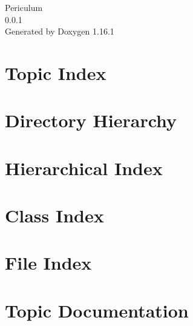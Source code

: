 \documentclass[twoside]{book}
\newcommand{\+}{\discretionary{\mbox{\scriptsize$\hookleftarrow$}}{}{}}
\newcommand{\clearemptydoublepage}{%
    \newpage{\pagestyle{empty}\cleardoublepage}%
  }
\begin{document}
  \raggedbottom
    \hypersetup{pageanchor=false,
                bookmarksnumbered=true,
                pdfencoding=unicode
               }
  \begin{titlepage}
  \vspace*{7cm}
  \begin{center}%
  {\Large Periculum}\\
  [1ex]\large 0.\+0.\+1 \\
  \vspace*{1cm}
  {\large Generated by Doxygen 1.16.1}\\
  \end{center}
  \end{titlepage}
  \clearemptydoublepage
  \tableofcontents
  \clearemptydoublepage
  \hypersetup{pageanchor=true}
\chapter{Topic Index}

\chapter{Directory Hierarchy}

\chapter{Hierarchical Index}

\chapter{Class Index}

\chapter{File Index}

\chapter{Topic Documentation}








\end{document}

